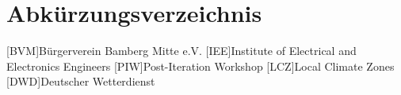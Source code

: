 \chapter*{Abkürzungsverzeichnis}

\begin{acronym}
    [BVM]{Bürgerverein Bamberg Mitte e.V.}
    [IEE]{Institute of Electrical and Electronics Engineers}
    [PIW]{Post-Iteration Workshop}
    [LCZ]{Local Climate Zones}
    [DWD]{Deutscher Wetterdienst}
\end{acronym}